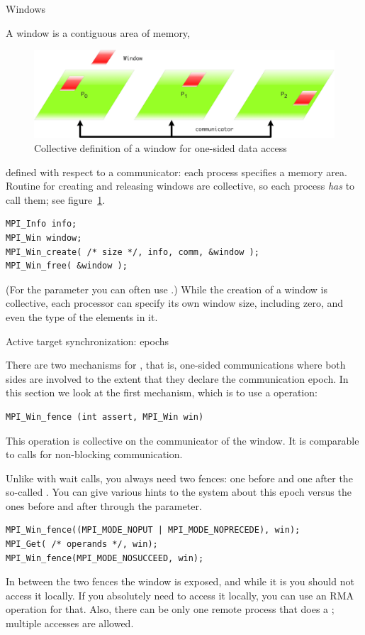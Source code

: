 
 {Windows}

A window is a contiguous area of memory,
\begin{figure}[ht]
  \includegraphics[scale=.1]{graphics/one-sided-window}
  \caption{Collective definition of a window for one-sided data access}
  \label{fig:window}
\end{figure}
defined with respect to a communicator: each process specifies a
memory area. Routine for creating and releasing windows
are collective, so each process \emph{has} to
call them; see figure~\ref{fig:window}. 
\begin{verbatim}
MPI_Info info;
MPI_Win window;
MPI_Win_create( /* size */, info, comm, &window );
MPI_Win_free( &window );
\end{verbatim}
(For the  parameter you can often use .)
While the creation of a window is collective, each
processor can specify its own window size, including zero, and even the type of the
elements in it.

 {Active target synchronization: epochs}

There are two mechanisms for , that is,
one-sided communications where both sides are involved to the extent that they declare
the communication epoch. In this section we look at the first mechanism,
which is to use a  operation:
\begin{verbatim}
MPI_Win_fence (int assert, MPI_Win win)
\end{verbatim}
This operation is collective on the communicator of the window.
It is comparable to  calls for non-blocking communication.

Unlike with wait calls, you always need two fences: one before and one after
the so-called . 
You can give various hints to the system about this epoch versus the ones
before and after through the  parameter.
\begin{verbatim}
MPI_Win_fence((MPI_MODE_NOPUT | MPI_MODE_NOPRECEDE), win);
MPI_Get( /* operands */, win);
MPI_Win_fence(MPI_MODE_NOSUCCEED, win);
\end{verbatim}
In between the two fences the window is exposed, and while it is you
should not access it locally. If you absolutely need to access it
locally, you can use an \ac{RMA} operation for that. Also, there can be only one
remote process that does a ; multiple  accesses are allowed.

